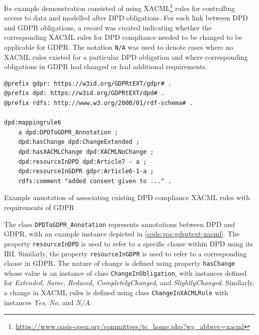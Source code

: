 Its example demonstration consisted of using XACML\footnote{\url{https://www.oasis-open.org/committees/tc_home.php?wg_abbrev=xacml}} rules for controlling access to data and modelled after DPD obligations.
For each link between DPD and GDPR obligations, a record was created indicating whether the corresponding XACML rules for DPD compliance needed to be changed to be applicable for GDPR. The notation \texttt{N/A} was used to denote cases where no XACML rules existed for a particular DPD obligation and where corresponding obligations in GDPR had changed or had additional requirements. 
\begin{listing}[htbp]
\begin{verbatim}
@prefix gdpr: https://w3id.org/GDPRtEXT/gdpr# .
@prefix dpd: https://w3id.org/GDPRtEXT/dpd# .
@prefix rdfs: http://www.w3.org/2000/01/rdf-schema# .

dpd:mappingrule6
    a dpd:DPDToGDPR_Annotation ;
    dpd:hasChange dpd:ChangeExtended ;
    dpd:hasXACMLChange dpd:XACMLNoChange ;
    dpd:resourceInDPD dpd:Article7 - a ;
    dpd:resourceInGDPR gdpr:Article6-1-a ;
    rdfs:comment "added consent given to ..." .
\end{verbatim}
\label{code:voc:gdprtext-xacml}
\caption{Example annotation of associating existing DPD compliance XACML rules with requirements of GDPR}
\end{listing}

The class \texttt{DPDToGDPR\_Annotation} represents annotations between DPD and GDPR, with an example instance depicted in \autoref{code:voc:gdprtext-xacml}. The property \texttt{resourceInDPD} is used to refer to a specific clause within DPD using its IRI. Similarly, the property \texttt{resourceInGDPR} is used to refer to a corresponding clause in GDPR. The nature of change is defined using property \texttt{hasChange} whose value is an instance of class \texttt{ChangeInObligation}, with instances defined for \textit{Extended, Same, Reduced, CompletelyChanged}, and \textit{SlightlyChanged}. Similarly, a change in XACML rules is defined using class \texttt{ChangeInXACMLRule} with instances \textit{Yes, No}, and \textit{N/A}.

